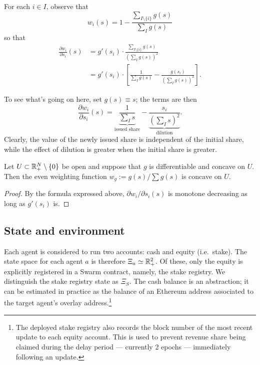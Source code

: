 For each $i\in I$, observe that
\[
  w_i(s) = 1 - \frac{\sum_{I\setminus\{i\}}g(s)}{\sum_I g(s)}
\]
so that
\begin{align*}
  \frac{\partial w_i}{\partial s_i}(s) &= g'(s_i)\cdot \frac{\sum_{I\setminus\{i\}}g(s)}{(\sum_I g(s))^2} \\
  &=g'(s_i)\cdot\left[ \frac{1}{\sum_I g(s)} - \frac{g(s_i)}{(\sum_I g(s))^2} \right].
\end{align*}

To see what's going on here, set $g(s)\equiv s$; the terms are then
\[
  \frac{\partial w_i}{\partial s_i}(s)=
  \underbrace{\frac{1}{\sum_I s}}_{\text{issued share}} - \underbrace{\frac{s_i}{(\sum_I s)^2}}_{\text{dilution}} .
\]
Clearly, the value of the newly issued share is independent of the initial share, while the effect of dilution is greater when the initial share is greater.

\begin{lemma}

  Let $U\subset \mathbb{R}_+^N\setminus\{0\}$ be open and suppose that $g$ is differentiable and concave on $U$.
  Then the even weighting function $w_g := g(s)/\sum g(s)$ is concave on $U$.

\end{lemma}
%
\begin{proof}

  By the formula expressed above, $\partial w_i/\partial s_i(s)$ is monotone decreasing as long as $g'(s_i)$ is. \qedhere

\end{proof}

\subsection{State and environment}
\label{section:state}

Each agent is considered to run two accounts: cash and equity (i.e.~stake).
%
The state space for each agent $a$ is therefore $\Xi_a\simeq\mathbb{R}_+^2$.
%
Of these, only the equity is explicitly registered in a Swarm contract, namely, the stake registry.
%
We distinguish the stake registry state as $\Xi_S$.
%
The cash balance is an abstraction; it can be estimated in practice as the balance of an Ethereum address associated to the target agent's overlay address.\footnote{The deployed stake registry also records the block number of the most recent update to each equity account. This is used to prevent revenue share being claimed during the delay period --- currently 2 epochs --- immediately following an update.}

